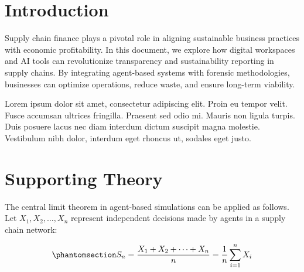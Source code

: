 \documentclass[
  oneside,
  open=any]{scrbook}
\renewcommand*\contentsname{Table of contents}
\newcommand\contentsname{Table of contents}
\begin{document}
\begin{frontmatter}
\begin{titlepage}
\begin{minipage}[b][\textheight][s]{\minipagewidth}
\authorblock

\affiliationblock

\vfill

\logoblock

\footerblock
\par

\end{minipage}
\clearpage
\restoregeometry


\clearpage
\end{titlepage}
\setcounter{page}{1}
\end{frontmatter}


\renewcommand*\contentsname{Table of contents}
{
\setcounter{tocdepth}{2}
\tableofcontents
}
\listoffigures
\listoftables

\mainmatter
\chapter{Introduction}\label{introduction}

Supply chain finance plays a pivotal role in aligning sustainable
business practices with economic profitability. In this document, we
explore how digital workspaces and AI tools can revolutionize
transparency and sustainability reporting in supply chains. By
integrating agent-based systems with forensic methodologies, businesses
can optimize operations, reduce waste, and ensure long-term viability.

Lorem ipsum dolor sit amet, consectetur adipiscing elit. Proin eu tempor
velit. Fusce accumsan ultrices fringilla. Praesent sed odio mi. Mauris
non ligula turpis. Duis posuere lacus nec diam interdum dictum suscipit
magna molestie. Vestibulum nibh dolor, interdum eget rhoncus ut, sodales
eget justo.

\chapter{Supporting Theory}\label{supporting-theory}

The central limit theorem in agent-based simulations can be applied as
follows. Let \(X_1, X_2, \ldots, X_n\) represent independent decisions
made by agents in a supply chain network:

\begin{equation}\phantomsection\label{eq-clt}{
S_n = \frac{X_1 + X_2 + \cdots + X_n}{n}
      = \frac{1}{n}\sum_{i=1}^{n} X_i
}\end{equation}
\end{document}
